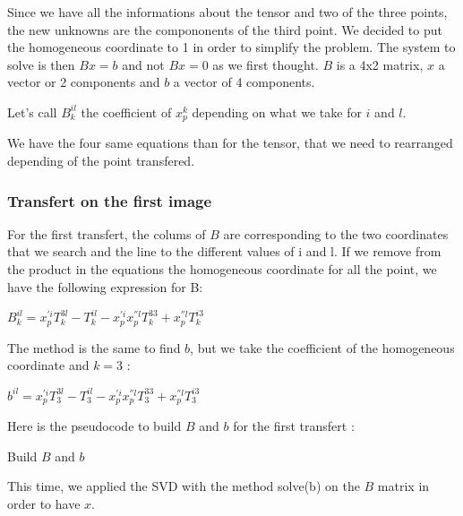 \documentclass{report}
\begin{document}
Since we have all the informations about the tensor and two of the three points, the new unknowns are the compononents of the third point. We decided to put the homogeneous coordinate to 1 in order to simplify the problem. The system to solve is then $Bx=b$ and not $Bx=0$ as we first thought. $B$ is a 4x2 matrix, $x$ a vector or 2 components and $b$ a vector of 4 components. 

Let's call $B_{k}^{il}$ the coefficient of $x_{p}^{k}$ depending on what we take for $i$ and $l$. 

We have the four same equations than for the tensor, that we need to rearranged depending of the point transfered.


\subsubsection{Transfert on the first image}
For the first transfert, the colums of $B$ are corresponding to the two coordinates that we search and the line to the different values of i and l. If we remove from the product in the equations the homogeneous coordinate for all the point, we have the following expression for B:

\begin{center}
$B_{k}^{il} = x_{p}^{'i}T_{k}^{3l} - T_{k}^{il} - x_{p}^{'i}x_{p}^{''l}T_{k}^{33} + x_{p}^{''l}T_{k}^{i3}$
\end{center}

The method is the same to find $b$, but we take the coefficient of the homogeneous coordinate and $k=3$ : 

\begin{center}
$b^{il} = x_{p}^{'i}T_{3}^{3l} - T_{3}^{il} - x_{p}^{'i}x_{p}^{''l}T_{3}^{33} + x_{p}^{''l}T_{3}^{i3}$
\end{center}


Here is the pseudocode to build $B$ and $b$ for the first transfert : 
\begin{algorithm}
\SetLine
\caption{Build $B$ and $b$}
\SetLine
{}
\end{algorithm}

This time, we applied the SVD with the method solve(b) on the $B$ matrix in order to have $x$. 
\end{document}
